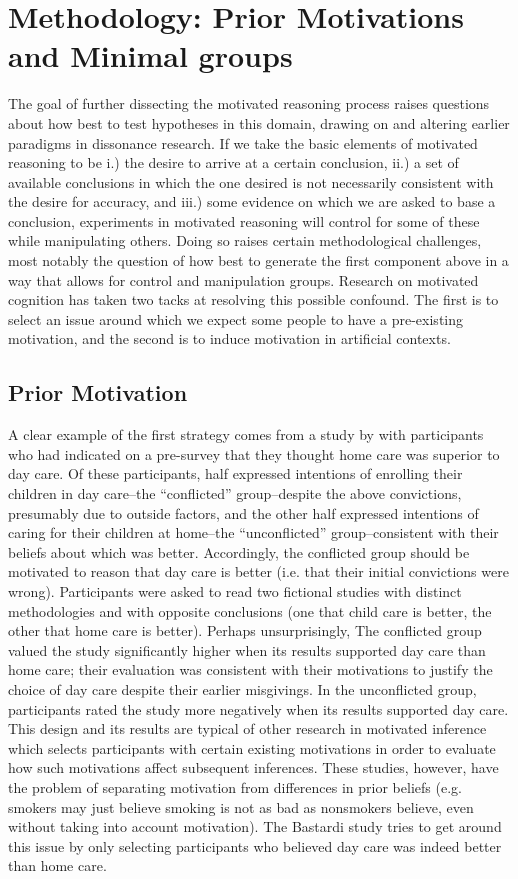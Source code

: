 \documentclass{article}
\begin{document}
\section{Methodology: Prior Motivations and Minimal groups}
The goal of further dissecting the motivated reasoning process raises questions about how best to test hypotheses in this domain, drawing on and altering earlier paradigms in dissonance research. If we take the basic elements of motivated reasoning to be i.) the desire to arrive at a certain conclusion, ii.) a set of available conclusions in which the one desired is not necessarily consistent with the desire for accuracy, and iii.) some evidence on which we are asked to base a conclusion, experiments in motivated reasoning will control for some of these while manipulating others. Doing so raises certain methodological challenges, most notably the question of how best to generate the first component above in a way that allows for control and manipulation groups. Research on motivated cognition has taken two tacks at resolving this possible confound. The first is to select an issue around which we expect some people to have a pre-existing motivation, and the second is to induce motivation in artificial contexts. 
\subsection{Prior Motivation}
A clear example of the first strategy comes from a study by \citet{Bastardi2011} with participants who had indicated on a pre-survey that they thought home care was superior to day care. Of these participants, half expressed intentions of enrolling their children in day care--the ``conflicted'' group--despite the above convictions, presumably due to outside factors, and the other half expressed intentions of caring for their children at home--the ``unconflicted'' group--consistent with their beliefs about which was better. Accordingly, the conflicted group should be motivated to reason that day care is better (i.e. that their initial convictions were wrong). Participants were asked to read two fictional studies with distinct methodologies and with opposite conclusions (one that child care is better, the other that home care is better). Perhaps unsurprisingly, The conflicted group valued the study significantly higher when its results supported day care than home care; their evaluation was consistent with their motivations to justify the choice of day care despite their earlier misgivings. In the unconflicted group, participants rated the study more negatively when its results supported day care. This design and its results are typical of other research in motivated inference which selects participants with certain existing motivations in order to evaluate how such motivations affect subsequent inferences. These studies, however, have the problem of separating motivation from differences in prior beliefs (e.g. smokers may just believe smoking is not as bad as nonsmokers believe, even without taking into account motivation). The Bastardi study tries to get around this issue by only selecting participants who believed day care was indeed better than home care.
\end{document}
